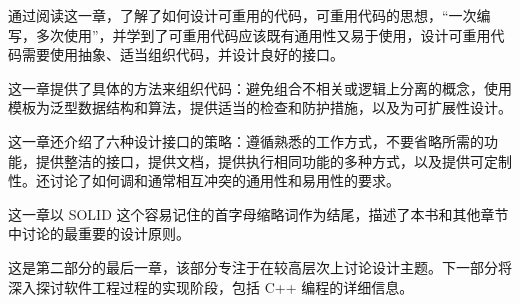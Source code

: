 通过阅读这一章，了解了如何设计可重用的代码，可重用代码的思想，“一次编写，多次使用”，并学到了可重用代码应该既有通用性又易于使用，设计可重用代码需要使用抽象、适当组织代码，并设计良好的接口。

这一章提供了具体的方法来组织代码：避免组合不相关或逻辑上分离的概念，使用模板为泛型数据结构和算法，提供适当的检查和防护措施，以及为可扩展性设计。

这一章还介绍了六种设计接口的策略：遵循熟悉的工作方式，不要省略所需的功能，提供整洁的接口，提供文档，提供执行相同功能的多种方式，以及提供可定制性。还讨论了如何调和通常相互冲突的通用性和易用性的要求。

这一章以 SOLID 这个容易记住的首字母缩略词作为结尾，描述了本书和其他章节中讨论的最重要的设计原则。

这是第二部分的最后一章，该部分专注于在较高层次上讨论设计主题。下一部分将深入探讨软件工程过程的实现阶段，包括 C++ 编程的详细信息。